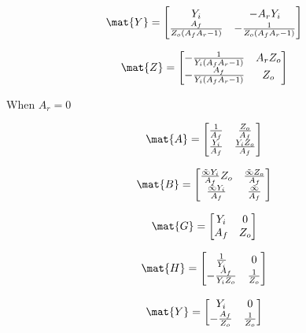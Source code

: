 \documentclass[a4paper, 12pt]{article}
\begin{document}
\begin{equation}
\mat{Y} = \left[\begin{matrix}Y_{i} & - A_{r} Y_{i}\\\frac{A_{f}}{Z_{o} \left(A_{f} A_{r} - 1\right)} & - \frac{1}{Z_{o} \left(A_{f} A_{r} - 1\right)}\end{matrix}\right]
\end{equation}

\begin{equation}
\mat{Z} = \left[\begin{matrix}- \frac{1}{Y_{i} \left(A_{f} A_{r} - 1\right)} & A_{r} Z_{o}\\- \frac{A_{f}}{Y_{i} \left(A_{f} A_{r} - 1\right)} & Z_{o}\end{matrix}\right]
\end{equation}


When $A_r=0$

\begin{equation}
\mat{A} = \left[\begin{matrix}\frac{1}{A_{f}} & \frac{Z_{o}}{A_{f}}\\\frac{Y_{i}}{A_{f}} & \frac{Y_{i} Z_{o}}{A_{f}}\end{matrix}\right]
\end{equation}

\begin{equation}
\mat{B} = \left[\begin{matrix}\frac{\tilde{\infty} Y_{i}}{A_{f}} Z_{o} & \frac{\tilde{\infty} Z_{o}}{A_{f}}\\\frac{\tilde{\infty} Y_{i}}{A_{f}} & \frac{\tilde{\infty}}{A_{f}}\end{matrix}\right]
\end{equation}

\begin{equation}
\mat{G} = \left[\begin{matrix}Y_{i} & 0\\A_{f} & Z_{o}\end{matrix}\right]
\end{equation}

\begin{equation}
\mat{H} =\left[\begin{matrix}\frac{1}{Y_{i}} & 0\\- \frac{A_{f}}{Y_{i} Z_{o}} & \frac{1}{Z_{o}}\end{matrix}\right]
\end{equation}


\begin{equation}
\mat{Y} = \left[\begin{matrix}Y_{i} & 0\\- \frac{A_{f}}{Z_{o}} & \frac{1}{Z_{o}}\end{matrix}\right]
\end{equation}
\end{document}
